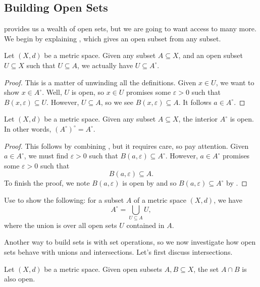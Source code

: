\documentclass[../main.tex]{subfiles}
\begin{document}
\subsection{Building Open Sets} \label{subsec:build-opens}
 provides us a wealth of open sets, but we are going to want access to many more. We begin by explaining , which gives an open subset from any subset.
\begin{lemma} \label{lem:all-opens-in-interior}
    Let $(X,d)$ be a metric space. Given any subset $A\subseteq X$, and an open subset $U\subseteq X$ such that $U\subseteq A$, we actually have $U\subseteq A^\circ$.
\end{lemma}
\begin{proof}
    This is a matter of unwinding all the definitions. Given $x\in U$, we want to show $x\in A^\circ$. Well, $U$ is open, so $x\in U$ promises some $\varepsilon>0$ such that $B(x,\varepsilon)\subseteq U$. However, $U\subseteq A$, so we see $B(x,\varepsilon)\subseteq A$. It follows $a\in A^\circ$.
\end{proof}
\begin{proposition} \label{prop:int-is-open}
    Let $(X,d)$ be a metric space. Given any subset $A\subseteq X$, the interior $A^\circ$ is open. In other words, $(A^\circ)^\circ=A^\circ$.
\end{proposition}
\begin{proof}
    This follows by combining , but it requires care, so pay attention. Given $a\in A^\circ$, we must find $\varepsilon>0$ such that $B(a,\varepsilon)\subseteq A^\circ$. However, $a\in A^\circ$ promises some $\varepsilon>0$ such that
    \[B(a,\varepsilon)\subseteq A.\]
    To finish the proof, we note $B(a,\varepsilon)$ is open by  and so $B(a,\varepsilon)\subseteq A^\circ$ by .
\end{proof}
\begin{exe} \label{exe:int-by-opens}
    Use  to show the following: for a subset $A$ of a metric space $(X,d)$, we have
    \[A^\circ=\bigcup_{U\subseteq A}U,\]
    where the union is over all open sets $U$ contained in $A$.
\end{exe}
Another way to build sets is with set operations, so we now investigate how open sets behave with unions and intersections. Let's first discuss intersections.
\begin{proposition} \label{prop:intersect-open-sets}
    Let $(X,d)$ be a metric space. Given open subsets $A,B\subseteq X$, the set $A\cap B$ is also open.
\end{proposition}
\end{document}
